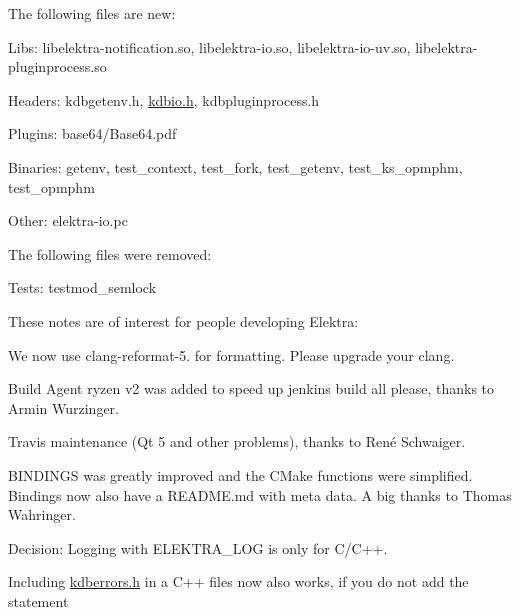The following files are new\+:


\begin{DoxyItemize}
\item Libs\+: {\ttfamily libelektra-\/notification.\+so}, {\ttfamily libelektra-\/io.\+so}, {\ttfamily libelektra-\/io-\/uv.\+so}, {\ttfamily libelektra-\/pluginprocess.\+so}
\item Headers\+: {\ttfamily kdbgetenv.\+h}, {\ttfamily \mbox{\hyperlink{kdbio_8h}{kdbio.\+h}}}, {\ttfamily kdbpluginprocess.\+h}
\item Plugins\+: {\ttfamily base64/\+Base64.\+pdf}
\item Binaries\+: {\ttfamily getenv}, {\ttfamily test\+\_\+context}, {\ttfamily test\+\_\+fork}, {\ttfamily test\+\_\+getenv}, {\ttfamily test\+\_\+ks\+\_\+opmphm}, {\ttfamily test\+\_\+opmphm}
\item Other\+: {\ttfamily elektra-\/io.\+pc}
\end{DoxyItemize}

The following files were removed\+:


\begin{DoxyItemize}
\item Tests\+: {\ttfamily testmod\+\_\+semlock}
\end{DoxyItemize}

These notes are of interest for people developing Elektra\+:


\begin{DoxyItemize}
\item We now use {\ttfamily clang-\/reformat-\/5.} for formatting. Please upgrade your clang.
\item Build Agent {\ttfamily ryzen v2} was added to speed up {\ttfamily jenkins build all please}, thanks to Armin Wurzinger.
\item Travis maintenance (Qt 5 and other problems), thanks to René Schwaiger.
\item {\ttfamily B\+I\+N\+D\+I\+N\+GS} was greatly improved and the C\+Make functions were simplified. Bindings now also have a {\ttfamily R\+E\+A\+D\+M\+E.\+md} with meta data. A big thanks to Thomas Wahringer.
\item Decision\+: Logging with {\ttfamily E\+L\+E\+K\+T\+R\+A\+\_\+\+L\+OG} is only for C/\+C++.
\item Including {\ttfamily \mbox{\hyperlink{kdberrors_8h}{kdberrors.\+h}}} in a C++ files now also works, if you do not add the statement
\end{DoxyItemize}



